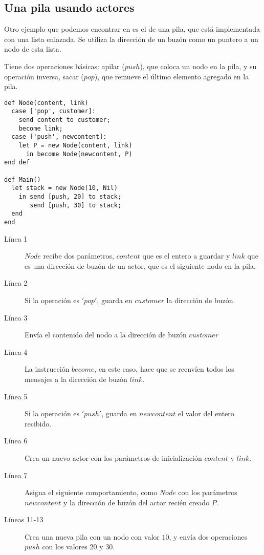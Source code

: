 \subsection{Una pila usando actores}\label{sal:pila}

Otro ejemplo que podemos encontrar en \cite{Agha:1986:AMC:7929} es el de una pila, que está implementada con una lista enlazada. Se utiliza la dirección de un buzón como un puntero a un nodo de esta lista. 

Tiene dos operaciones básicas: apilar ($push$), que coloca un nodo en la pila, y su operación inversa, sacar ($pop$), que remueve el último elemento agregado en la pila.

\begin{lstlisting}[language=sal, style=simple]
def Node(content, link)
  case ['pop', customer]:
    send content to customer;
    become link;
  case ['push', newcontent]:
    let P = new Node(content, link)
      in become Node(newcontent, P)
end def

def Main() 
  let stack = new Node(10, Nil)
    in send [push, 20] to stack;
       send [push, 30] to stack;
  end
end
\end{lstlisting}

\begin{description}

\item [Línea 1] $Node$ recibe dos parámetros, $content$ que es el entero a guardar y $link$ que es una dirección de buzón de un actor, que es el siguiente nodo en la pila.
\item [Línea 2] Si la operación es $'pop'$, guarda en $customer$ la dirección de buzón.
\item [Línea 3] Envía el contenido del nodo a la dirección de buzón $customer$
\item [Línea 4] La instrucción $become$, en este caso, hace que se reenvíen todos los mensajes a la dirección de buzón $link$. 
\item [Línea 5] Si la operación es $'push'$, guarda en $newcontent$ el valor del entero recibido.
\item [Línea 6] Crea un nuevo actor con los parámetros de inicialización $content$ y $link$.
\item [Línea 7] Asigna el siguiente comportamiento, como $Node$ con los parámetros $newcontent$ y la dirección de buzón del actor recién creado $P$. 
\item [Líneas 11-13] Crea una nueva pila con un nodo con valor $10$, y envía dos operaciones $push$ con los valores $20$ y $30$.
\end{description}

